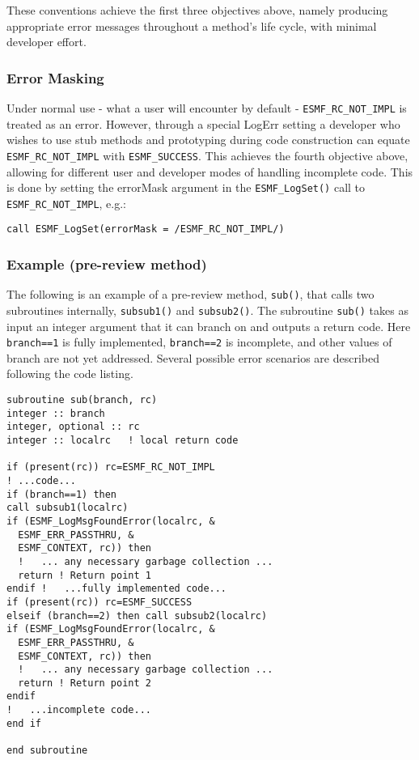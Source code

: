 These conventions achieve the first three objectives above, namely producing appropriate error messages throughout a method's life cycle, with minimal developer effort.

\subsubsection{Error Masking}

Under normal use - what a user will encounter by default - {\tt ESMF\_RC\_NOT\_IMPL} is treated as an error. However, through a special LogErr setting a developer who wishes to use stub methods and prototyping during code construction can equate {\tt ESMF\_RC\_NOT\_IMPL} with {\tt ESMF\_SUCCESS}. This achieves the fourth objective above, allowing for different user and developer modes of handling incomplete code. This is done by setting the errorMask argument in the {\tt ESMF\_LogSet()} call to {\tt ESMF\_RC\_NOT\_IMPL}, e.g.:

\begin{verbatim}
call ESMF_LogSet(errorMask = /ESMF_RC_NOT_IMPL/)
\end{verbatim}

\subsubsection{Example (pre-review method)}

The following is an example of a pre-review method, {\tt sub()}, that calls two subroutines internally, {\tt subsub1()} and {\tt subsub2()}. The subroutine {\tt sub()} takes as input an integer argument that it can branch on and outputs a return code. Here {\tt branch==1} is fully implemented, {\tt branch==2} is incomplete, and other values of branch are not yet addressed. Several possible error scenarios are described following the code listing.

\begin{verbatim}
subroutine sub(branch, rc)
integer :: branch
integer, optional :: rc
integer :: localrc   ! local return code

if (present(rc)) rc=ESMF_RC_NOT_IMPL
! ...code...
if (branch==1) then
call subsub1(localrc)
if (ESMF_LogMsgFoundError(localrc, &
  ESMF_ERR_PASSTHRU, &
  ESMF_CONTEXT, rc)) then
  !   ... any necessary garbage collection ...
  return ! Return point 1
endif !   ...fully implemented code...
if (present(rc)) rc=ESMF_SUCCESS
elseif (branch==2) then call subsub2(localrc)
if (ESMF_LogMsgFoundError(localrc, &
  ESMF_ERR_PASSTHRU, &
  ESMF_CONTEXT, rc)) then
  !   ... any necessary garbage collection ...
  return ! Return point 2
endif
!   ...incomplete code...
end if

end subroutine
\end{verbatim}

